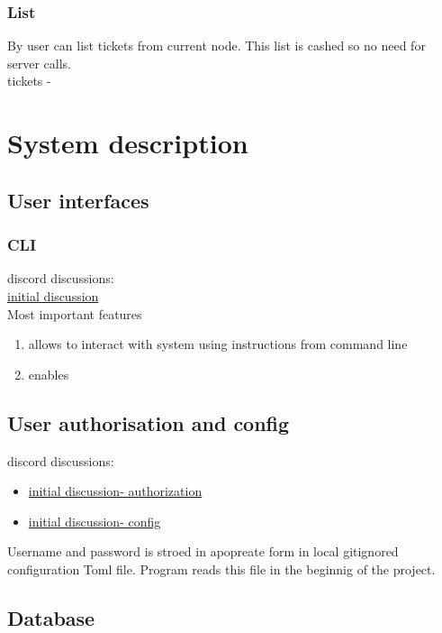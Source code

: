 \subsubsection{List}\label{GF:CRUD:LIST}
By  user can list tickets from current node. This list is cashed so no 
need for server calls.\\
tickets - 

\newpage
\section{System description}
\subsection{User interfaces}\label{UI:POC}

\subsubsection{CLI}
discord discussions:\\
\href{https://discord.com/channels/892473074434310144/896321419498098689}{initial discussion}\\
Most important features
\begin{enumerate}
    \item allows to interact with system using instructions from command line
    \item enables 
\end{enumerate}

\subsection{User authorisation and config}\label{AUTH:POC}\label{CONFIG:POC}
discord discussions:
\begin{itemize}
    \item \href{https://discord.com/channels/892473074434310144/896357478600671272}{initial discussion- authorization}
    \item \href{https://discord.com/channels/892473074434310144/896360600542789642}{initial discussion- config}
\end{itemize}
Username and password is stroed in apopreate form in local gitignored configuration Toml file. 
Program reads this file in the beginnig of the project. 
\subsection{Database}\label{DB:POC}
